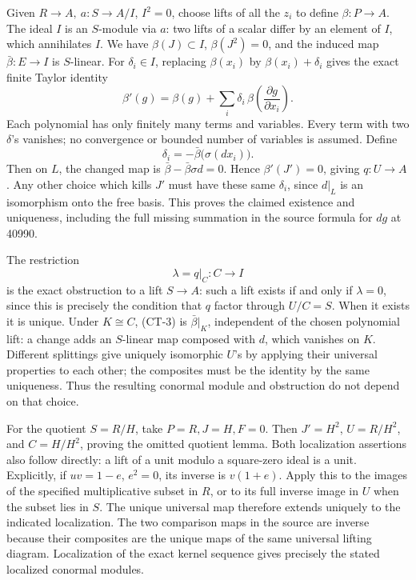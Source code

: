 Given \(R\to A,\ a:S\to A/I\), \(I^2=0\), choose lifts of all the \(z_i\) to define \(\beta:P\to A\). The ideal \(I\) is an \(S\)-module via \(a\): two lifts of a scalar differ by an element of \(I\), which annihilates \(I\). We have \(\beta(J)\subset I\), \(\beta(J^2)=0\), and the induced map \(\bar\beta:E\to I\) is \(S\)-linear. For \(\delta_i\in I\), replacing \(\beta(x_i)\) by \(\beta(x_i)+\delta_i\) gives the exact finite Taylor identity \[
\beta'(g)=\beta(g)+\sum_i\delta_i\,
\beta\!\left(\frac{\partial g}{\partial x_i}\right).
\tag{CT-2}
\] Each polynomial has only finitely many terms and variables. Every term with two \(\delta\)'s vanishes; no convergence or bounded number of variables is assumed. Define \[
\delta_i=-\bar\beta\bigl(\sigma(dx_i)\bigr).
\] Then on \(L\), the changed map is \(\bar\beta-\bar\beta\sigma d=0\). Hence \(\beta'(J')=0\), giving \(q:U\to A\). Any other choice which kills \(J'\) must have these same \(\delta_i\), since \(d|_L\) is an isomorphism onto the free basis. This proves the claimed existence and uniqueness, including the full missing summation in the source formula for \(dg\) at 40990.

The restriction \[
\lambda=q|_C:C\longrightarrow I
\tag{CT-3}
\] is the exact obstruction to a lift \(S\to A\): such a lift exists if and only if \(\lambda=0\), since this is precisely the condition that \(q\) factor through \(U/C=S\). When it exists it is unique. Under \(K\cong C\), (CT-3) is \(\bar\beta|_K\), independent of the chosen polynomial lift: a change adds an \(S\)-linear map composed with \(d\), which vanishes on \(K\). Different splittings give uniquely isomorphic \(U\)'s by applying their universal properties to each other; the composites must be the identity by the same uniqueness. Thus the resulting conormal module and obstruction do not depend on that choice.

For the quotient \(S=R/H\), take \(P=R,J=H,F=0\). Then \(J'=H^2\), \(U=R/H^2\), and \(C=H/H^2\), proving the omitted quotient lemma. Both localization assertions also follow directly: a lift of a unit modulo a square-zero ideal is a unit. Explicitly, if \(uv=1-e\), \(e^2=0\), its inverse is \(v(1+e)\). Apply this to the images of the specified multiplicative subset in \(R\), or to its full inverse image in \(U\) when the subset lies in \(S\). The unique universal map therefore extends uniquely to the indicated localization. The two comparison maps in the source are inverse because their composites are the unique maps of the same universal lifting diagram. Localization of the exact kernel sequence gives precisely the stated localized conormal modules.

